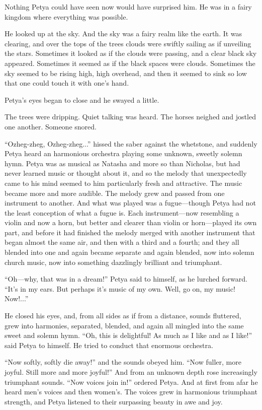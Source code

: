 Nothing Petya could have seen now would have surprised him. He
was in a fairy kingdom where everything was possible.

He looked up at the sky. And the sky was a fairy realm like the
earth.  It was clearing, and over the tops of the trees clouds
were swiftly sailing as if unveiling the stars. Sometimes it
looked as if the clouds were passing, and a clear black sky
appeared. Sometimes it seemed as if the black spaces were
clouds. Sometimes the sky seemed to be rising high, high
overhead, and then it seemed to sink so low that one could touch
it with one's hand.

Petya's eyes began to close and he swayed a little.

The trees were dripping. Quiet talking was heard. The horses
neighed and jostled one another. Someone snored.

``Ozheg-zheg, Ozheg-zheg...'' hissed the saber against the
whetstone, and suddenly Petya heard an harmonious orchestra
playing some unknown, sweetly solemn hymn. Petya was as musical
as Natasha and more so than Nicholas, but had never learned music
or thought about it, and so the melody that unexpectedly came to
his mind seemed to him particularly fresh and attractive. The
music became more and more audible. The melody grew and passed
from one instrument to another. And what was played was a
fugue---though Petya had not the least conception of what a fugue
is.  Each instrument---now resembling a violin and now a horn,
but better and clearer than violin or horn---played its own part,
and before it had finished the melody merged with another
instrument that began almost the same air, and then with a third
and a fourth; and they all blended into one and again became
separate and again blended, now into solemn church music, now
into something dazzlingly brilliant and triumphant.

``Oh---why, that was in a dream!'' Petya said to himself, as he
lurched forward. ``It's in my ears. But perhaps it's music of my
own. Well, go on, my music! Now!...''

He closed his eyes, and, from all sides as if from a distance,
sounds fluttered, grew into harmonies, separated, blended, and
again all mingled into the same sweet and solemn hymn. ``Oh, this
is delightful! As much as I like and as I like!'' said Petya to
himself. He tried to conduct that enormous orchestra.

``Now softly, softly die away!'' and the sounds obeyed him. ``Now
fuller, more joyful. Still more and more joyful!'' And from an
unknown depth rose increasingly triumphant sounds. ``Now voices
join in!'' ordered Petya. And at first from afar he heard men's
voices and then women's. The voices grew in harmonious triumphant
strength, and Petya listened to their surpassing beauty in awe
and joy.

